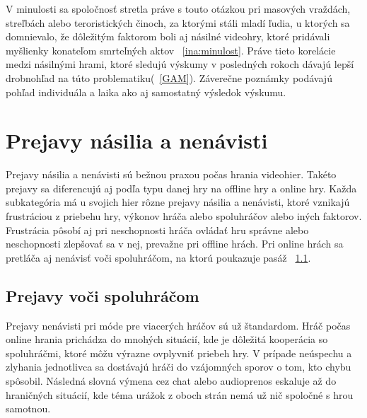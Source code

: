 \documentclass[10pt,twoside,slovak,a4paper]{article}
\begin{document}
V minulosti sa spoločnosť stretla práve s touto otázkou pri masových vraždách, streľbách alebo teroristických činoch, za ktorými stáli mladí ľudia, u ktorých sa domnievalo, že dôležitým faktorom boli aj násilné videohry, ktoré pridávali myšlienky konateľom smrteľných aktov ~\ref{ina:minulost}. Práve tieto korelácie medzi násilnými hrami, ktoré sledujú výskumy v posledných rokoch dávajú lepší drobnohľad na túto problematiku(~\ref{GAM}). Záverečne poznámky podávajú pohľad individuála a laika ako aj samostatný výsledok výskumu.




\section{Prejavy násilia a nenávisti} \label{prejavy}

Prejavy násilia a nenávisti sú bežnou praxou počas hrania videohier. Takéto prejavy sa diferencujú aj podľa typu danej hry na offline hry a online hry. Každa subkategória má u svojich hier rôzne prejavy násilia a nenávisti, ktoré vznikajú frustráciou z priebehu hry, výkonov hráča alebo spoluhráčov alebo iných faktorov. Frustrácia pôsobí aj pri neschopnosti hráča ovládať hru správne alebo neschopnosti zlepšovať sa v nej\cite{UoR-Failure}, prevažne pri offline hrách. Pri online hrách sa pretláča aj nenávisť voči spoluhráčom, na ktorú poukazuje pasáž ~\ref{ina:spoluhraci}. 


\subsection{Prejavy voči spoluhráčom} \label{ina:spoluhraci}
Prejavy nenávisti pri móde pre viacerých hráčov sú už štandardom. Hráč počas online hrania prichádza do mnohých situácií, kde je dôležitá kooperácia so spoluhráčmi, ktoré môžu výrazne ovplyvniť priebeh hry. V prípade neúspechu a zlyhania jednotlivca sa dostávajú hráči do vzájomných sporov o tom, kto chybu spôsobil. Následná slovná výmena cez chat alebo audioprenos eskaluje až do hraničných situácií, kde téma urážok z oboch strán nemá už nič spoločné s hrou samotnou. 
\end{document}
